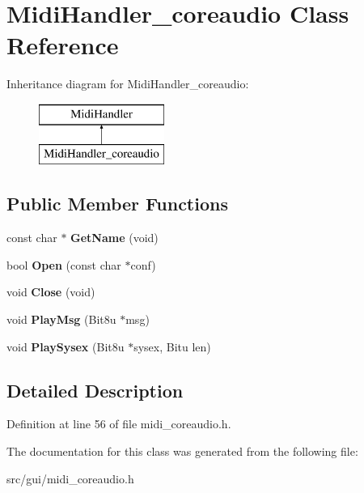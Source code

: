 \hypertarget{classMidiHandler__coreaudio}{\section{Midi\-Handler\-\_\-coreaudio Class Reference}
\label{classMidiHandler__coreaudio}
}
Inheritance diagram for Midi\-Handler\-\_\-coreaudio\-:\begin{figure}[H]
\begin{center}
\leavevmode
\includegraphics[height=2.000000cm]{classMidiHandler__coreaudio}
\end{center}
\end{figure}
\subsection*{Public Member Functions}
\begin{DoxyCompactItemize}
\item 
\hypertarget{classMidiHandler__coreaudio_a9b23b25b48ccc4731518bc80e7aea47b}{const char $\ast$ {\bfseries Get\-Name} (void)}\label{classMidiHandler__coreaudio_a9b23b25b48ccc4731518bc80e7aea47b}

\item 
\hypertarget{classMidiHandler__coreaudio_af829f7f514638c6aa7ff8177071ec66b}{bool {\bfseries Open} (const char $\ast$conf)}\label{classMidiHandler__coreaudio_af829f7f514638c6aa7ff8177071ec66b}

\item 
\hypertarget{classMidiHandler__coreaudio_aea1001d40f3aae55e3265086c8461bfa}{void {\bfseries Close} (void)}\label{classMidiHandler__coreaudio_aea1001d40f3aae55e3265086c8461bfa}

\item 
\hypertarget{classMidiHandler__coreaudio_a414def0cab06f4205c3d1affab2d94b3}{void {\bfseries Play\-Msg} (Bit8u $\ast$msg)}\label{classMidiHandler__coreaudio_a414def0cab06f4205c3d1affab2d94b3}

\item 
\hypertarget{classMidiHandler__coreaudio_a201c3fd877b130d6fa5c01c9a123a2e6}{void {\bfseries Play\-Sysex} (Bit8u $\ast$sysex, Bitu len)}\label{classMidiHandler__coreaudio_a201c3fd877b130d6fa5c01c9a123a2e6}

\end{DoxyCompactItemize}


\subsection{Detailed Description}


Definition at line 56 of file midi\-\_\-coreaudio.\-h.



The documentation for this class was generated from the following file\-:\begin{DoxyCompactItemize}
\item 
src/gui/midi\-\_\-coreaudio.\-h\end{DoxyCompactItemize}
